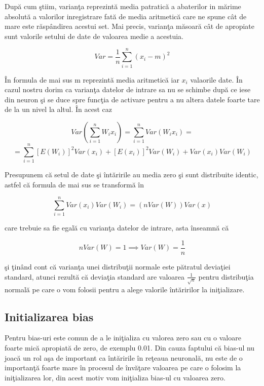 Dup\u{a} cum \c{s}tiim, varian\c{t}a reprezint\u{a} media patratic\u{a} a abaterilor in m\u{a}rime absolut\u{a} a valorilor inregistrare fat\u{a} de media aritmetic\u{a} care ne spune c\^{a}t de mare este r\u{a}sp\^{a}ndirea  acestui set. Mai precis, varian\c{t}a m\u{a}soar\u{a} c\^{a}t de apropiate sunt valorile setului de date de valoarea medie a acestuia.

$$Var = \frac{1}{n} \sum_{i=1}^{n} (x_i - m )^2 $$

\^{I}n formula de mai sus m reprezint\u{a} media aritmetic\u{a} iar $x_i$ valaorile date. \^{I}n cazul nostru dorim ca varian\c{t}a datelor de intrare sa nu se schimbe dup\u{a} ce iese din neuron \c{s}i se duce spre func\c{t}ia de activare pentru a nu altera datele foarte tare de la un nivel la altul. \^{I}n acest caz

$$Var(\sum_{i=1}^{n} W_i x_i) = \sum_{i=1}^{n} Var(W_i x_i) = $$
$$ = \sum_{i=1}^{n} [E(W_i)]^2 Var(x_i) + [E(x_i)]^2 Var(W_i) + Var(x_i) Var(W_i)$$

Presupunem c\u{a} setul de date \c{s}i \^{i}nt\u{a}ririle au media zero \c{s}i sunt distribuite identic, astfel c\u{a} formula de mai sus se transform\u{a} \^{i}n

$$\sum_{i=1}^{n} Var(x_i) Var(W_i) = (n Var(W)) Var(x)$$

care trebuie sa fie egal\u{a} cu varian\c{t}a datelor de intrare, asta \^{i}nseamn\u{a} c\u{a} 

$$n Var(W) = 1 \implies Var(W) =  \frac{1}{n} $$

\c{s}i \c{t}in\^{a}nd cont c\u{a} varian\c{t}a unei distribu\c{t}ii normale este p\u{a}tratul devia\c{t}iei standard, atunci rezult\u{a} c\u{a} devia\c{t}ia standard are valoarea $\frac{1}{\sqrt{n}}$ pentru distribu\c{t}ia normal\u{a} pe care o vom folosii pentru a alege valorile \^{i}nt\u{a}ririlor la ini\c{t}ializare.

\subsection{Initializarea bias}

Pentru bias-uri este comun de a le ini\c{t}ializa cu valorea zero sau cu o valoare foarte mic\u{a} apropiat\u{a} de zero, de exemplu 0.01. Din cauza faptului c\u{a} bias-ul nu joac\u{a} un rol a\c{s}a de important ca \^{i}nt\u{a}ririle \^{i}n re\c{t}eaua neuronal\u{a}, nu este de o importan\c{t}\u{a} foarte mare \^{i}n procesul de \^{i}nv\u{a}\c{t}are valoarea pe care o folosim la ini\c{t}ializarea lor, din acest motiv vom ini\c{t}ializa bias-ul cu valoarea zero.

